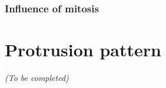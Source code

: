 \subsubsection{Influence of mitosis}


\section{Protrusion pattern}
\label{sec:protrusion}

\begin{center}
	\textit{(To be completed)}
\end{center}




